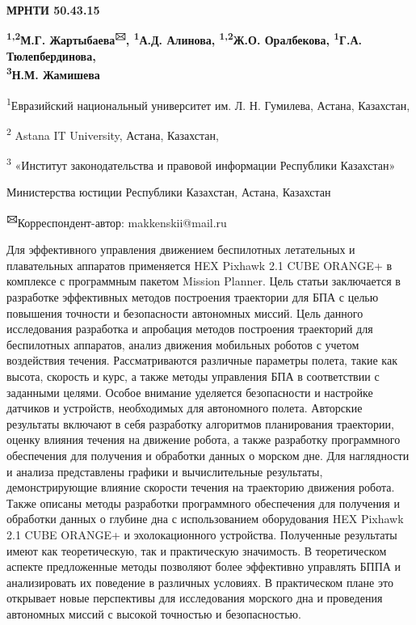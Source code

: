 
\newpage
{\bfseries МРНТИ 50.43.15}


\begin{center}
{\bfseries \textsuperscript{1,2}М.Г. Жартыбаева\textsuperscript{🖂},
\textsuperscript{1}А.Д. Алинова, \textsuperscript{1,2}Ж.О. Оралбекова,
\textsuperscript{1}Г.А. Тюлепбердинова,\\
\textsuperscript{3}Н.М. Жамишева}

\textsuperscript{1}Евразийский национальный университет им. Л. Н.
Гумилева, Астана, Казахстан,

\textsuperscript{2} Astana IT University, Астана, Казахстан,

\textsuperscript{3} «Институт законодательства и правовой информации
Республики Казахстан»

Министерства юстиции Республики Казахстан, Астана, Казахстан

{\bfseries \textsuperscript{🖂}}Корреспондент-автор: makkenskii@mail.ru

\end{center}
Для эффективного управления движением беспилотных летательных и
плавательных аппаратов применяется HEX Pixhawk 2.1 CUBE ORANGE+ в
комплексе с программным пакетом Mission Planner. Цель статьи заключается
в разработке эффективных методов построения траектории для БПА с целью
повышения точности и безопасности автономных миссий. Цель данного
исследования разработка и апробация методов построения траекторий для
беспилотных аппаратов, анализ движения мобильных роботов с учетом
воздействия течения. Рассматриваются различные параметры полета, такие
как высота, скорость и курс, а также методы управления БПА в
соответствии с заданными целями. Особое внимание уделяется безопасности
и настройке датчиков и устройств, необходимых для автономного полета.
Авторские результаты включают в себя разработку алгоритмов планирования
траектории, оценку влияния течения на движение робота, а также
разработку программного обеспечения для получения и обработки данных о
морском дне. Для наглядности и анализа представлены графики и
вычислительные результаты, демонстрирующие влияние скорости течения на
траекторию движения робота. Также описаны методы разработки программного
обеспечения для получения и обработки данных о глубине дна с
использованием оборудования HEX Pixhawk 2.1 CUBE ORANGE+ и
эхолокационного устройства. Полученные результаты имеют как
теоретическую, так и практическую значимость. В теоретическом аспекте
предложенные методы позволяют более эффективно управлять БППА и
анализировать их поведение в различных условиях. В практическом плане
это открывает новые перспективы для исследования морского дна и
проведения автономных миссий с высокой точностью и безопасностью.

